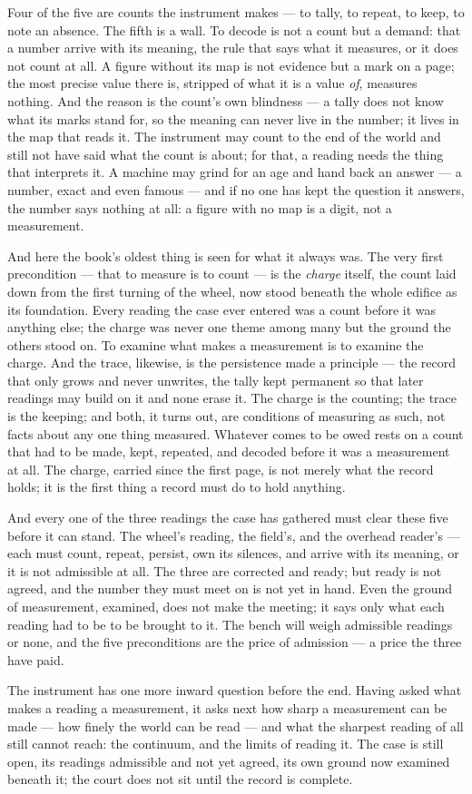 Four of the five are counts the instrument makes --- to tally, to repeat, to keep, to note an absence. The
fifth is a wall. To decode is not a count but a demand: that a number arrive with its meaning, the rule that
says what it measures, or it does not count at all. A figure without its map is not evidence but a mark on a
page; the most precise value there is, stripped of what it is a value \emph{of}, measures nothing. And the
reason is the count's own blindness --- a tally does not know what its marks stand for, so the meaning can never
live in the number; it lives in the map that reads it. The instrument may count to the end of the world and
still not have said what the count is about; for that, a reading needs the thing that interprets it. A machine
may grind for an age and hand back an answer --- a number, exact and even famous --- and if no one has kept the
question it answers, the number says nothing at all: a figure with no map is a digit, not a measurement.

And here the book's oldest thing is seen for what it always was. The very first precondition --- that to measure
is to count --- is the \emph{charge} itself, the count laid down from the first turning of the wheel, now stood
beneath the whole edifice as its foundation. Every reading the case ever entered was a count before it was
anything else; the charge was never one theme among many but the ground the others stood on. To examine what
makes a measurement is to examine the charge. And the trace, likewise, is the persistence made a principle ---
the record that only grows and never unwrites, the tally kept permanent so that later readings may build on it
and none erase it. The charge is the counting; the trace is the keeping; and both, it turns out, are conditions
of measuring as such, not facts about any one thing measured. Whatever comes to be owed rests on a count that
had to be made, kept, repeated, and decoded before it was a measurement at all. The charge, carried since the
first page, is not merely what the record holds; it is the first thing a record must do to hold anything.

And every one of the three readings the case has gathered must clear these five before it can stand. The
wheel's reading, the field's, and the overhead reader's --- each must count, repeat, persist, own its silences,
and arrive with its meaning, or it is not admissible at all. The three are corrected and ready; but ready is not
agreed, and the number they must meet on is not yet in hand. Even the ground of measurement, examined, does not
make the meeting; it says only what each reading had to be to be brought to it. The bench will weigh admissible
readings or none, and the five preconditions are the price of admission --- a price the three have paid.

The instrument has one more inward question before the end. Having asked what makes a reading a measurement, it
asks next how sharp a measurement can be made --- how finely the world can be read --- and what the sharpest
reading of all still cannot reach: the continuum, and the limits of reading it. The case is still open, its readings
admissible and not yet agreed, its own ground now examined beneath it; the court does not sit until the record
is complete.
